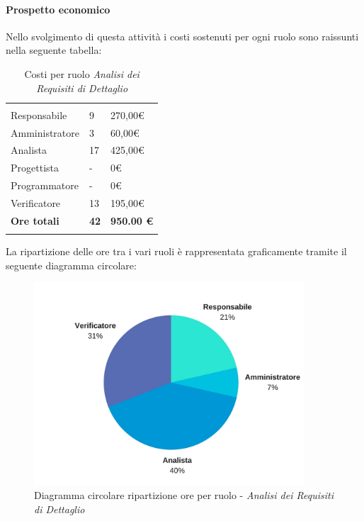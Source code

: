 			\paragraph{Prospetto economico}
			Nello svolgimento di questa attività i costi sostenuti per ogni ruolo sono raissunti nella seguente tabella:
			\begin{table}[H]
			\centering
			\begin{tabular}{p{4cm}|C{4cm}|C{4cm}}
				
				 & &\\
				Responsabile & 9 & 270,00\euro \\
				\hline
				Amministratore& 3 & 60,00\euro \\
				\hline
				Analista & 17 & 425,00\euro \\
				\hline
				Progettista & - & 0\euro \\
				\hline
				Programmatore & - & 0\euro \\
				\hline
				Verificatore & 13 & 195,00\euro \\
				\hline
				\textbf{Ore totali} & \textbf{42} & \textbf{950.00 \euro} \\
			\end{tabular}
			\caption{Costi per ruolo \textit{Analisi dei Requisiti di Dettaglio}}
		\end{table}
		
		La ripartizione delle ore tra i vari ruoli è rappresentata graficamente tramite il seguente diagramma circolare:

			\begin{figure}[h] 
			\centering 
			\includegraphics[width=0.9\textwidth]{images/CircolareAnalisiRequisitiDiDettaglio.jpg} 
			\caption{Diagramma circolare ripartizione ore per ruolo - \textit{Analisi dei Requisiti di Dettaglio}}
			\label{CircolareAnalisiRequisitiDiDettaglio}
			\end{figure}
		


